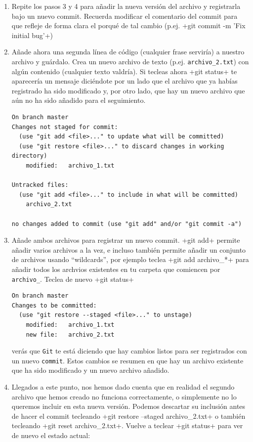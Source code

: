 \documentclass[a4paper,10pt]{article}
\begin{document}
\begin{enumerate}
    \item Repite los pasos 3 y 4 para añadir la nueva versión del archivo y registrarla bajo un nuevo commit. Recuerda modificar el comentario del commit para que refleje de forma clara el porqué de tal cambio (p.ej. \cverb+git commit -m 'Fix initial bug'+)
    
    \item Añade ahora una segunda línea de código (cualquier frase serviría) a nuestro archivo y guárdalo. Crea un nuevo archivo de texto (p.ej. \verb+archivo_2.txt+) con algún contenido (cualquier texto valdría). Si tecleas ahora \cverb+git status+ te aparecería un mensaje diciéndote por un lado que el archivo que ya habías registrado ha sido modificado y, por otro lado, que hay un nuevo archivo que aún no ha sido añadido para el seguimiento.
    
    \begin{lstlisting}[style=custom]
On branch master
Changes not staged for commit:
  (use "git add <file>..." to update what will be committed)
  (use "git restore <file>..." to discard changes in working directory)
	modified:   archivo_1.txt

Untracked files:
  (use "git add <file>..." to include in what will be committed)
	archivo_2.txt

no changes added to commit (use "git add" and/or "git commit -a")
    \end{lstlisting}
    
    \item Añade ambos archivos para registrar un nuevo commit.  \cverb+git add+ permite añadir varios archivos a la vez, e incluso también permite añadir un conjunto de archivos usando ``wildcards'', por ejemplo teclea \cverb+git add archivo_*+ para añadir todos los archvios existentes en tu carpeta que comiencen por \verb+archivo_+. Teclea de nuevo \cverb+git status+
    
    \begin{lstlisting}[style=custom]
On branch master
Changes to be committed:
  (use "git restore --staged <file>..." to unstage)
	modified:   archivo_1.txt
	new file:   archivo_2.txt
    \end{lstlisting}    
    verás que \verb+Git+ te está diciendo que hay cambios listos para ser registrados con un nuevo \verb+commit+. Estos cambios se resumen en que hay un archivo existente que ha sido modificado y un nuevo archivo añadido.
    
    \item Llegados a este punto, nos hemos dado cuenta que en realidad el segundo archivo que hemos creado no funciona correctamente, o simplemente no lo queremos incluir en esta nueva versión. Podemos descartar su inclusión antes de hacer el commit tecleando \cverb+git restore --staged archivo_2.txt+ o también tecleando \cverb+git reset archivo_2.txt+. Vuelve a teclear \cverb+git status+ para ver de nuevo el estado actual:
    

\end{enumerate}
\end{document}
